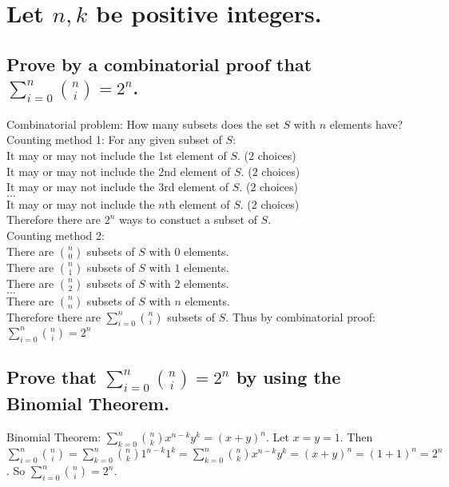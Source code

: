 \documentclass[10pt, letterpaper, titlepage]{article}
\newcommand{\0}{\varnothing}
\newcommand{\1}{\{ 1 \}}
\newcommand{\2}{\{ (1,1) \}}
\begin{document}
    \newpage
    \section{Let $n,k$ be positive integers.}
        \subsection{Prove by a combinatorial proof that $\sum_{i=0}^{n} \binom{n}{i} = 2^n$.}
            Combinatorial problem: How many subsets does the set $S$ with $n$ elements have?
            Counting method 1:
            For any given subset of $S$:
            \\It may or may not include the 1st element of $S$. ($2$ choices)
            \\It may or may not include the 2nd element of $S$. ($2$ choices)
            \\It may or may not include the 3rd element of $S$. ($2$ choices)
            \\$\hdots$
            \\It may or may not include the $n$th element of $S$. ($2$ choices)
            \\Therefore there are $2^n$ ways to constuct a subset of $S$.
            \\Counting method 2:
            \\There are $\binom{n}{0}$ subsets of $S$ with $0$ elements.
            \\There are $\binom{n}{1}$ subsets of $S$ with $1$ elements.
            \\There are $\binom{n}{2}$ subsets of $S$ with $2$ elements.
            \\$\hdots$
            \\There are $\binom{n}{n}$ subsets of $S$ with $n$ elements.
            \\Therefore there are $\sum_{i=0}^{n} \binom{n}{i}$ subsets of $S$.
            Thus by combinatorial proof: $\sum_{i=0}^{n} \binom{n}{i} = 2^n$

        \subsection{Prove that $\sum_{i=0}^{n} \binom{n}{i} = 2^n$ by using the Binomial Theorem.}
            Binomial Theorem: $\sum_{k=0}^{n} \binom{n}{k}x^{n-k} y^k = (x+y)^n$.
            Let $x = y = 1$.
            Then $\sum_{i=0}^{n} \binom{n}{i} = \sum_{k=0}^{n} \binom{n}{k}1^{n-k} 1^k = \sum_{k=0}^{n} \binom{n}{k}x^{n-k} y^k = (x+y)^n = (1+1)^n = 2^n$.
            So $\sum_{i=0}^{n} \binom{n}{i} = 2^n$.
\end{document}
